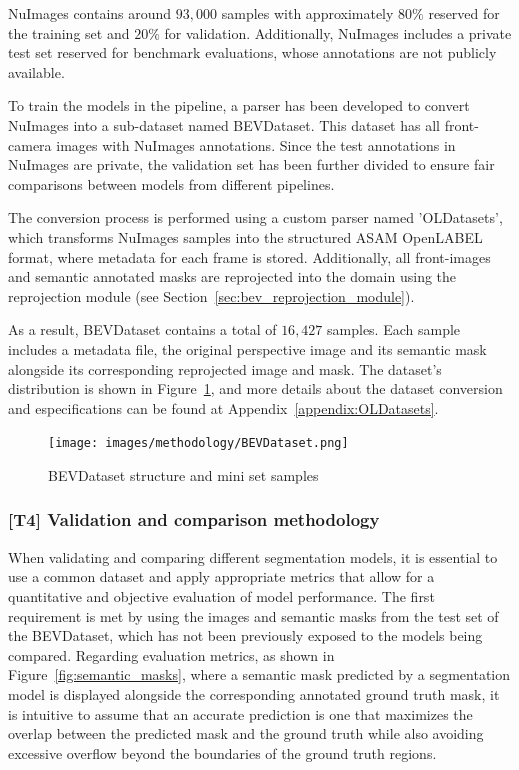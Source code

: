 NuImages contains around $93,000$ samples with approximately $80\%$ reserved for the training set and $20\%$ for validation. Additionally, NuImages includes a private test set reserved for benchmark evaluations, whose annotations are not publicly available.

To train the models in the pipeline, a parser has been developed to convert NuImages into a sub-dataset named BEVDataset. This dataset has all front-camera images with NuImages annotations. Since the test annotations in NuImages are private, the validation set has been further divided to ensure fair comparisons between models from different pipelines.

The conversion process is performed using a custom parser named 'OLDatasets', which transforms NuImages samples into the structured ASAM OpenLABEL format, where metadata for each frame is stored. Additionally, all front-images and semantic annotated masks are reprojected into the  domain using the  reprojection module (see Section~\ref{sec:bev_reprojection_module}).

As a result, BEVDataset contains a total of $16,427$ samples. Each sample includes a metadata file, the original perspective image and its semantic mask alongside its corresponding  reprojected image and mask. The dataset's distribution is shown in Figure~\ref{fig:bev_dataset}, and more details about the dataset conversion and especifications can be found at Appendix~\ref{appendix:OLDatasets}.

\begin{figure}[h!]
    \centering
    \texttt{[image: images/methodology/BEVDataset.png]}
    \caption{BEVDataset structure and mini set samples}
    \label{fig:bev_dataset}
\end{figure}

\subsubsection{[T4] Validation and comparison methodology}
When validating and comparing different segmentation models, it is essential to use a common dataset and apply appropriate metrics that allow for a quantitative and objective evaluation of model performance. The first requirement is met by using the  images and semantic masks from the test set of the BEVDataset, which has not been previously exposed to the models being compared. Regarding evaluation metrics, as shown in Figure~\ref{fig:semantic_masks}, where a semantic mask predicted by a segmentation model is displayed alongside the corresponding annotated ground truth mask, it is intuitive to assume that an accurate prediction is one that maximizes the overlap between the predicted mask and the ground truth while also avoiding excessive overflow beyond the boundaries of the ground truth regions.

